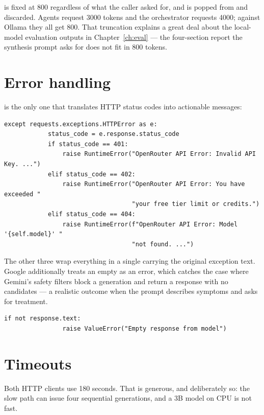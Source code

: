  is fixed at 800 regardless of what the caller asked for, and  is popped from  and discarded. Agents request 3000 tokens and the orchestrator requests 4000; against Ollama they all get 800. That truncation explains a great deal about the local-model evaluation outputs in Chapter~\ref{ch:eval} --- the four-section report the synthesis prompt asks for does not fit in 800 tokens.

\section{Error handling}

 is the only one that translates HTTP status codes into actionable messages:

\begin{lstlisting}[style=py,firstnumber=70]
        except requests.exceptions.HTTPError as e:
            status_code = e.response.status_code
            if status_code == 401:
                raise RuntimeError("OpenRouter API Error: Invalid API Key. ...")
            elif status_code == 402:
                raise RuntimeError("OpenRouter API Error: You have exceeded "
                                   "your free tier limit or credits.")
            elif status_code == 404:
                raise RuntimeError(f"OpenRouter API Error: Model '{self.model}' "
                                   "not found. ...")
\end{lstlisting}

The other three wrap everything in a single  carrying the original exception text. Google additionally treats an empty  as an error, which catches the case where Gemini's safety filters block a generation and return a response with no candidates --- a realistic outcome when the prompt describes symptoms and asks for treatment.

\begin{lstlisting}[style=py,firstnumber=142]
            if not response.text:
                raise ValueError("Empty response from model")
\end{lstlisting}

\section{Timeouts}

Both HTTP clients use 180 seconds. That is generous, and deliberately so: the slow path can issue four sequential generations, and a 3B model on CPU is not fast.


